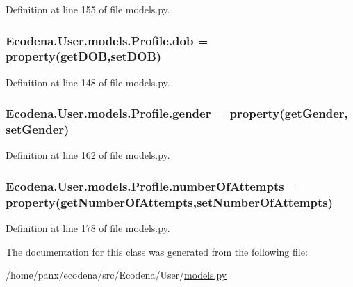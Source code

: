 Definition at line 155 of file models.py.

\hypertarget{class_ecodena_1_1_user_1_1models_1_1_profile_a3a0fa5d3a99befa925c288201084bcf8}{
\subsubsection[{dob}]{\setlength{\rightskip}{0pt plus 5cm}Ecodena.User.models.Profile.dob = property(getDOB,setDOB)}}
\label{d2/de8/class_ecodena_1_1_user_1_1models_1_1_profile_a3a0fa5d3a99befa925c288201084bcf8}


Definition at line 148 of file models.py.

\hypertarget{class_ecodena_1_1_user_1_1models_1_1_profile_a919cf572b6e01a3d3f007fa97fc2e2e2}{
\subsubsection[{gender}]{\setlength{\rightskip}{0pt plus 5cm}Ecodena.User.models.Profile.gender = property(getGender, setGender)}}
\label{d2/de8/class_ecodena_1_1_user_1_1models_1_1_profile_a919cf572b6e01a3d3f007fa97fc2e2e2}


Definition at line 162 of file models.py.

\hypertarget{class_ecodena_1_1_user_1_1models_1_1_profile_a75974e348d3ce063cae9aed156ea4ae5}{
\subsubsection[{numberOfAttempts}]{\setlength{\rightskip}{0pt plus 5cm}Ecodena.User.models.Profile.numberOfAttempts = property(getNumberOfAttempts,setNumberOfAttempts)}}
\label{d2/de8/class_ecodena_1_1_user_1_1models_1_1_profile_a75974e348d3ce063cae9aed156ea4ae5}


Definition at line 178 of file models.py.



The documentation for this class was generated from the following file:\begin{DoxyCompactItemize}
\item 
/home/panx/ecodena/src/Ecodena/User/\hyperlink{_user_2models_8py}{models.py}\end{DoxyCompactItemize}

